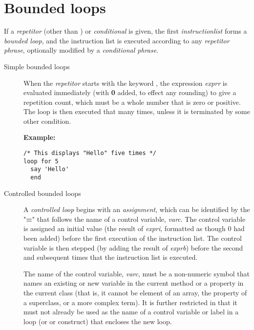 \section{Bounded loops}
 If a \emph{repetitor} (other than ) or
\emph{conditional} is given, the first \emph{instructionlist}
forms a \emph{bounded loop}, and the instruction list is executed
according to any \emph{repetitor phrase}, optionally modified by a
\emph{conditional phrase}.
\begin{description}
\item[Simple bounded loops]

When the \emph{repetitor} starts with the keyword ,
the expression \emph{exprr} is evaluated immediately
(with \textbf{0} added, to effect any rounding) to give a repetition
count, which must be a whole number that is zero or positive.
The loop is then executed that many times, unless it is terminated by
some other condition.

\textbf{Example:}
\begin{lstlisting}
/* This displays "Hello" five times */
loop for 5
  say 'Hello'
  end
\end{lstlisting}
\item[Controlled bounded loops]

A \emph{controlled loop} begins with an \emph{assignment},
which can be identified by the "\textbf{=}" that follows the name
of a control variable, \emph{varc}.
The control variable is assigned an initial value (the result of
\emph{expri}, formatted as though 0 had been added)
before the first execution of the instruction list.
The control variable is then stepped (by adding the result of
\emph{exprb}) before the second and subsequent times that the
instruction list is executed.
 
The name of the control variable, \emph{varc}, must be a non-numeric
symbol that names an existing or new variable in the current method or a
property in the current class (that is, it cannot be element of an
array, the property of a superclass, or a more complex term).  It is
further restricted in that it must not already be used as the name of a
control variable or label in a loop (or  or 
construct) that encloses the new loop.
 

\end{description}
